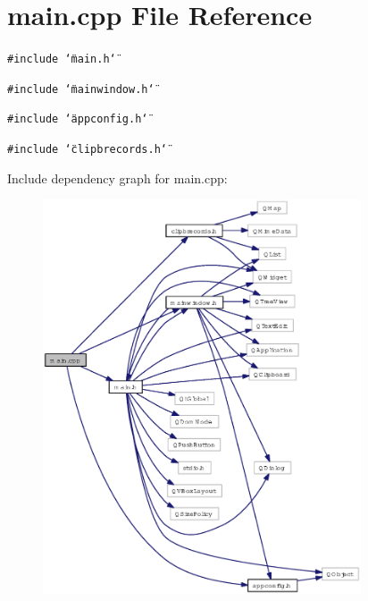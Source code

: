 \section{main.cpp File Reference}
\label{main_8cpp}
{\tt \#include \char`\"{}main.h\char`\"{}}\par
{\tt \#include \char`\"{}mainwindow.h\char`\"{}}\par
{\tt \#include \char`\"{}appconfig.h\char`\"{}}\par
{\tt \#include \char`\"{}clipbrecords.h\char`\"{}}\par


Include dependency graph for main.cpp:\begin{figure}[H]
\begin{center}
\leavevmode
\includegraphics[width=267pt]{main_8cpp__incl}
\end{center}
\end{figure}

